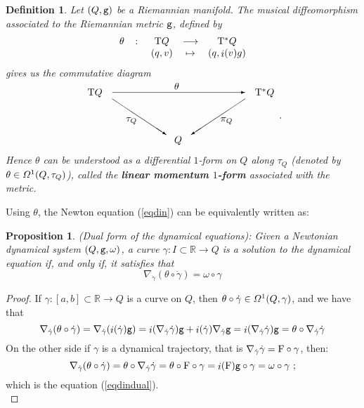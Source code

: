 \documentclass[12pt]{report}
\newtheorem{prop}[teor]{Proposition}
\newtheorem{definition}[teor]{Definition}
\def\beq{\begin{equation}}
\def\eeq{\end{equation}}
\def\qed{\ifvmode\removelastskip\fi
{\unskip\nobreak\hfil\penalty50\hbox{}\nobreak\hfil
\hbox{\vrule height1.2ex width1.2ex}\parfillskip=0pt
\finalhyphendemerits=0 \par\smallskip}}
\def\df{{\mit\Omega}}
\def\Real{\mathbb{R}}
\def\Tan{{\rm T}}
\def\inn{\mathop{i}\nolimits}
\begin{document}
\begin{definition}
Let $(Q,{\tt g})$ be a Riemannian manifold. The musical diffeomorphism associated to the Riemannian metric ${\tt g}$, defined by
$$
\begin{array}{ccccc}
\theta & \colon & \Tan Q & \longrightarrow & \Tan^*Q  \\
& & (q,v) &\mapsto & (q,\inn (v)g)
\end{array}
$$
gives us the commutative diagram
$$
\begin{array}{ccc}
\Tan Q &
\begin{picture}(135,10)(0,0)
\put(63,6){\mbox{$\theta$}}
\put(0,3){\vector(1,0){135}}
\end{picture}
& \Tan^*Q
\\ &
\begin{picture}(135,45)(0,0)
\put(14,22){\mbox{$\tau_Q$}}
\put(110,22){\mbox{$\pi_Q$}}
\put(63,0){\mbox{$Q$}}
\put(0,45){\vector(3,-2){55}}
\put(135,45){\vector(-3,-2){55}}
\end{picture} &
\end{array}.
$$
Hence $\theta$ can be understood as a differential $1$-form on $Q$ {\sl along} $\tau_Q$
(denoted by $\theta\in\df^1(Q,\tau_Q)$),
called the \textbf{linear momentum $1$-form}
 associated with the metric.
\end{definition}

Using $\theta$, the Newton equation (\ref{eqdin}) can be equivalently written as:

\begin{prop}
{\rm (Dual form of the dynamical equations)}: 
Given a Newtonian dynamical system $(Q,{\tt g},\omega)$,
a curve $\gamma\colon I\subset\Real\to Q$
is a solution to the dynamical equation if, and only if, it satisfies that
\beq
\nabla_{\dot\gamma}(\theta\circ\dot\gamma)=\omega\circ\gamma
\label{eqdindual}
\eeq
\end{prop}
\begin{proof}
If $\gamma\colon [a,b]\subset\Real\to Q$ is a curve on $Q$, then
$\theta\circ\dot\gamma\in\df^1(Q,\gamma)$, and we have that $$
\nabla_{\dot\gamma}(\theta\circ\dot\gamma )=
\nabla_{\dot\gamma}(\inn(\dot\gamma){\tt g})=
\inn(\nabla_{\dot\gamma}\dot\gamma){\tt g}+\inn(\dot\gamma)\nabla_{\dot\gamma}{\tt g}=
\inn(\nabla_{\dot\gamma}\dot\gamma){\tt g}=
\theta\circ\nabla_{\dot\gamma}\dot\gamma
$$
On the other side if $\gamma$ is a dynamical trajectory, that is 
$\nabla_{\dot\gamma}\dot\gamma= {\rm F}\circ\gamma$, then:
$$
\nabla_{\dot\gamma}(\theta\circ\dot\gamma)=
\theta\circ\nabla_{\dot\gamma}\dot\gamma=
\theta\circ {\rm F}\circ\gamma=
\inn({\rm F}){\tt g}\circ\gamma=
\omega\circ\gamma \ ;
$$
which is the equation (\ref{eqdindual}).
\\ \qed \end{proof}
\end{document}
